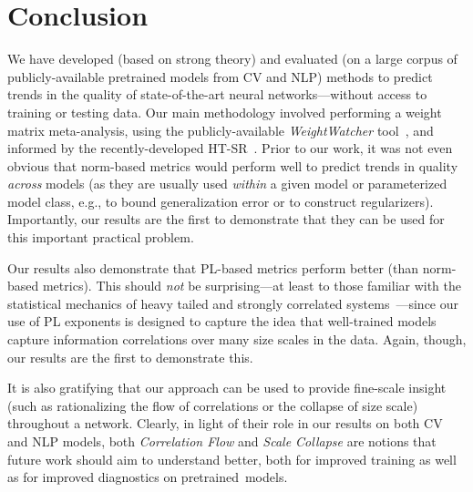 \vspace{-1mm}
\section{Conclusion}
\label{sxn:conc}

We have developed (based on strong theory) and evaluated (on a large corpus of publicly-available pretrained models from CV and NLP) methods to predict trends in the quality of state-of-the-art neural networks---without access to training or testing data.
Our main methodology involved performing a weight matrix meta-analysis, using the publicly-available \emph{WeightWatcher} tool~\cite{weightwatcher_package}, and informed by the recently-developed HT-SR~\cite{MM18_TR, MM19_HTSR_ICML, MM20_SDM}.
Prior to our work, it was not even obvious that norm-based metrics would perform well to predict trends in quality \emph{across} models (as they are usually used \emph{within} a given model or parameterized model class, e.g., to bound generalization error or to construct regularizers).
Importantly, our results are the first to demonstrate that they can be used for this important practical problem.

Our results also demonstrate that PL-based metrics perform better (than norm-based metrics). 
This should \emph{not} be surprising---at least to those familiar with the statistical mechanics of heavy tailed and strongly correlated systems~\cite{BouchaudPotters03, SornetteBook, BP11, bun2017}---since our use of PL exponents is designed to capture the idea that well-trained models capture information correlations over many size scales in the data.
Again, though, our results are the first to demonstrate this.

It is also gratifying that our approach can be used to provide fine-scale insight (such as rationalizing the flow of correlations or the collapse of size scale) throughout a network. 
Clearly, in light of their role in our results on both CV and NLP models, both \emph{Correlation Flow} and \emph{Scale Collapse} are notions that future work should aim to understand better, both for improved training as well as for improved diagnostics on pretrained~models.

